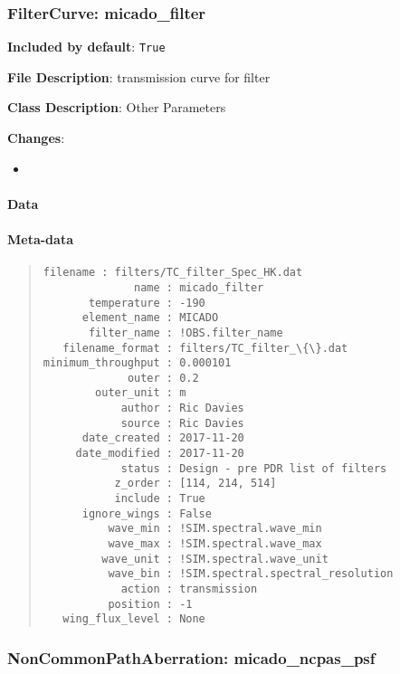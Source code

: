 \subsubsection{FilterCurve: \textquotedbl{}micado\_filter\textquotedbl{}%
  \label{filtercurve-micado-filter}%
}

\textbf{Included by default}: \texttt{True}

\textbf{File Description}: transmission curve for filter

\textbf{Class Description}: Other Parameters

\textbf{Changes}:

\begin{itemize}
\item \end{itemize}


\paragraph{Data%
  \label{id1}%
}


\paragraph{Meta-data%
  \label{id2}%
}

\begin{quote}
\begin{alltt}
\begin{lstlisting}[frame=single]
          filename : filters/TC_filter_Spec_HK.dat
              name : micado_filter
       temperature : -190
      element_name : MICADO
       filter_name : !OBS.filter_name
   filename_format : filters/TC_filter_\{\}.dat
minimum_throughput : 0.000101
             outer : 0.2
        outer_unit : m
            author : Ric Davies
            source : Ric Davies
      date_created : 2017-11-20
     date_modified : 2017-11-20
            status : Design - pre PDR list of filters
           z_order : [114, 214, 514]
           include : True
      ignore_wings : False
          wave_min : !SIM.spectral.wave_min
          wave_max : !SIM.spectral.wave_max
         wave_unit : !SIM.spectral.wave_unit
          wave_bin : !SIM.spectral.spectral_resolution
            action : transmission
          position : -1
   wing_flux_level : None
\end{lstlisting}
\end{alltt}
\end{quote}


\subsubsection{NonCommonPathAberration: \textquotedbl{}micado\_ncpas\_psf\textquotedbl{}%
  \label{noncommonpathaberration-micado-ncpas-psf}%
}

